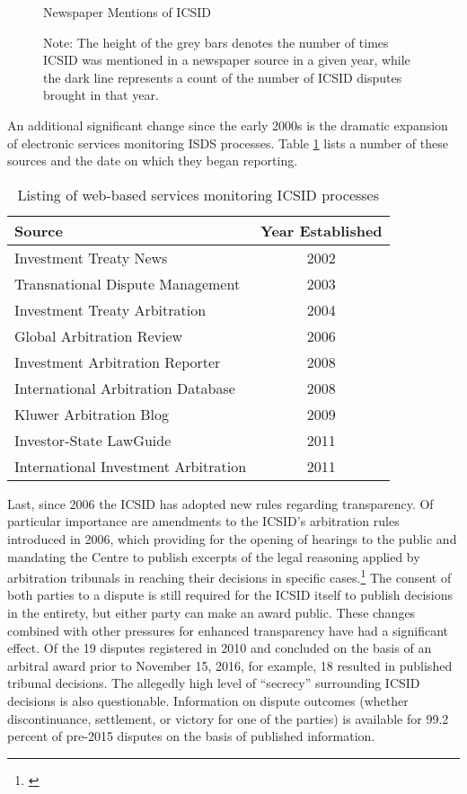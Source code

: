 \documentclass[12pt,onesided]{amsart}
\begin{document}
\begin{figure}[ht]
	\centering
	\caption{Newspaper Mentions of ICSID}
	\label{fig:icsidMedia}
	\resizebox{.8\textwidth}{!}{}
	\caption*{Note: The height of the grey bars denotes the number of times ICSID was mentioned in a newspaper source in a given year, while the dark line represents a count of the number of ICSID disputes brought in that year.}
\end{figure}
\FloatBarrier

An additional significant change since the early 2000s is the dramatic expansion of electronic services monitoring ISDS processes. Table \ref{tab:disputeSites} lists a number of these sources and the date on which they began reporting. 

\begin{table}[ht]
\centering
\caption{Listing of web-based services monitoring ICSID processes}
\label{tab:disputeSites}
\begin{tabular}{lc}
	\hline\hline
	Source & Year Established \\
	\hline
	Investment Treaty News & 2002 \\
	Transnational Dispute Management & 2003 \\
	Investment Treaty Arbitration & 2004 \\
	Global Arbitration Review & 2006 \\
	Investment Arbitration Reporter & 2008 \\
	International Arbitration Database & 2008 \\
	Kluwer Arbitration Blog & 2009 \\
	Investor-State LawGuide & 2011 \\
	International Investment Arbitration & 2011 \\
	\hline\hline
\end{tabular}
\end{table}
\FloatBarrier

Last, since 2006 the ICSID has adopted new rules regarding transparency. Of particular importance are amendments to the ICSID's arbitration rules introduced in 2006, which providing for the opening of hearings to the public and mandating the Centre to publish excerpts of the legal reasoning applied by arbitration tribunals in reaching their decisions in specific cases.\footnote{\citet{yackee20112006,antonietti:2006}} The consent of both parties to a dispute is still required for the ICSID itself to publish decisions in the entirety, but either party can make an award public. These changes combined with other pressures for enhanced transparency have had a significant effect. Of the 19 disputes registered in 2010 and concluded on the basis of an arbitral award prior to November 15, 2016, for example, 18 resulted in published tribunal decisions. The allegedly high level of ``secrecy'' surrounding ICSID decisions is also questionable. Information on dispute outcomes (whether discontinuance, settlement, or victory for one of the parties) is available for 99.2 percent of pre-2015 disputes on the basis of published information.
\end{document}
